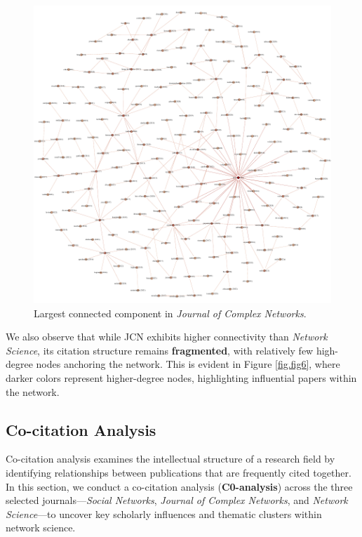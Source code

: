 \documentclass[twocolumn]{article}
\begin{document}
	\begin{figure}[htbp]
		\centering
		\includegraphics[width=\columnwidth]{"Journal of Complex Networks/Gephi/largest_component.pdf"}
		\caption{Largest connected component in \textit{Journal of Complex Networks}.}
		\label{fig.fig7}
	\end{figure}
	
	We also observe that while JCN exhibits higher connectivity than \textit{Network Science}, its citation structure remains \textbf{fragmented}, with relatively few high-degree nodes anchoring the network. This is evident in Figure \ref{fig.fig6}, where darker colors represent higher-degree nodes, highlighting influential papers within the network.
	
	\subsection{Co-citation Analysis}
	
	Co-citation analysis examines the intellectual structure of a research field by identifying relationships between publications that are frequently cited together. In this section, we conduct a co-citation analysis (\textbf{C0-analysis}) across the three selected journals—\textit{Social Networks}, \textit{Journal of Complex Networks}, and \textit{Network Science}—to uncover key scholarly influences and thematic clusters within network science.
	
\end{document}
